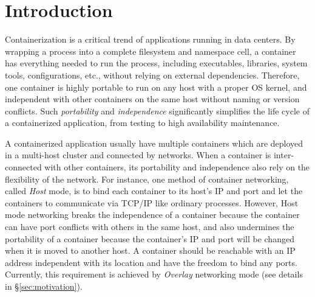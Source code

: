 \section{Introduction} \label{sec:introduction}


Containerization is a critical trend of applications running in data centers.
By wrapping a process into a complete filesystem and namespace cell, a container
has everything needed to run the process, including executables, libraries, system
tools, configurations, etc., without relying on external dependencies.
Therefore, one container
is highly portable to run on any host with a proper OS kernel, and independent
with other containers on the same host without naming or version conflicts.
Such {\em portability} and {\em independence} significantly simplifies 
the life cycle of a containerized application, from testing to high availability 
maintenance.

A containerized application usually have multiple containers which are 
deployed in a multi-host cluster and connected by networks. When a container
is inter-connected with other containers, its portability and independence 
also rely on the flexibility of the network. For instance, one method of 
container networking, called 
{\em Host} mode, is to bind each container to its host's IP
and port and let the containers to communicate via TCP/IP like ordinary 
processes.
However, Host mode networking breaks the independence of a container because
the container can have port conflicts with others in the same host, and also undermines
the portability of a container because the container's IP and port will be changed when
it is moved to another host. A container should be reachable with 
an IP address independent with its location and 
have the freedom to bind any ports. 
Currently, this requirement is achieved by {\em Overlay} networking mode
(see details in \S\ref{sec:motivation}).

